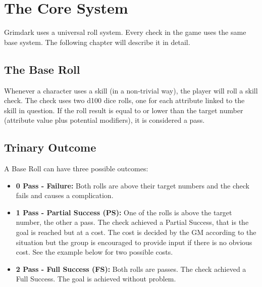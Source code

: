 \section{The Core System} %
\label{sec:base_system}
Grimdark uses a universal roll system. Every check in the game uses the same base system. The following chapter will describe it in detail.
\subsection{The Base Roll}
Whenever a character uses a skill (in a non-trivial way), the player will roll a skill check.
The check uses two d100 dice rolls, one for each attribute linked to the skill in question.
If the roll result is equal to or lower than the target number (attribute value plus potential modifiers), it is considered a pass.

\subsection{Trinary Outcome}
A Base Roll can have three possible outcomes: \\
\begin{itemize}
	\item \textbf{0 Pass - Failure:} Both rolls are above their target numbers and the check fails and causes a complication.
	\item \textbf{1 Pass - Partial Success (PS):} One of the rolls is above the target number, the other a pass. The check achieved a Partial Success, that is the goal is reached but at a cost. The cost is decided by the GM according to the situation but the group is encouraged to provide input if there is no obvious cost. See the example below for two possible costs.
	\item \textbf{2 Pass - Full Success (FS):} Both rolls are passes. The check achieved a Full Success. The goal is achieved without problem.
\end{itemize}

